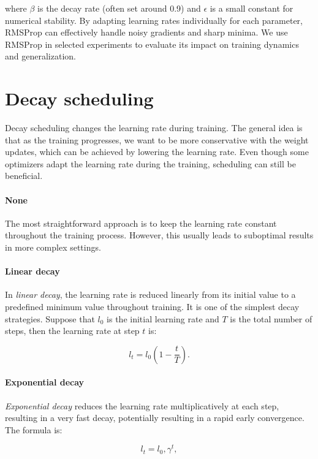 where $\beta$ is the decay rate (often set around 0.9) and $\epsilon$ is a small constant for numerical stability. By adapting learning rates individually for each parameter, RMSProp can effectively handle noisy gradients and sharp minima. We use RMSProp in selected experiments to evaluate its impact on training dynamics and generalization.

\section{Decay scheduling}
\label{subsec:decay-scheduling}

Decay scheduling changes the learning rate during training. The general idea is that as the training progresses, we want to be more conservative with the weight updates, which can be achieved by lowering the learning rate. Even though some optimizers adapt the learning rate during the training, scheduling can still be beneficial. 

\paragraph{None}
The most straightforward approach is to keep the learning rate constant throughout the training process. However, this usually leads to suboptimal results in more complex settings.

\paragraph{Linear decay}
In \emph{linear decay}, the learning rate is reduced linearly from its initial value to a predefined minimum value throughout training. It is one of the simplest decay strategies. Suppose that $l_0$ is the initial learning rate and $T$ is the total number of steps, then the learning rate at step $t$ is:

\begin{equation} 
	\label{eq:linear-decay} 
	l_t = l_0 \left(1 - \frac{t}{T}\right). 
\end{equation}

\paragraph{Exponential decay}
\emph{Exponential decay} reduces the learning rate multiplicatively at each step, resulting in a very fast decay, potentially resulting in a rapid early convergence. The formula is:

\begin{equation} 
	\label{eq:exponential-decay} 
	l_t = l_0 , \gamma^{t}, 
\end{equation}

